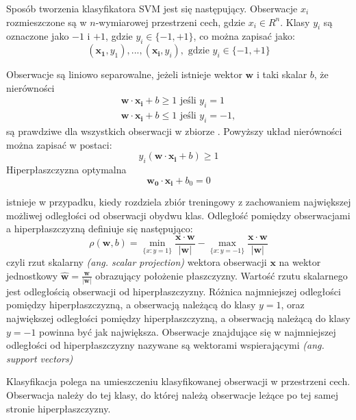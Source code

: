 \documentclass[a4paper,12pt,twoside,openany]{report}
\newcommand{\ang}[1]{\textit{(ang. #1)}}
\begin{document}
Sposób tworzenia klasyfikatora SVM jest się następujący.
Obserwacje $x_i$ rozmieszczone są w $n$-wymiarowej przestrzeni cech, gdzie $x_i \in R^n$.
Klasy $y_i$ są oznaczone jako $-1$ i $+1$, gdzie $y_i \in \{-1, +1\}$, co można zapisać jako:
\begin{equation}
	(\bm{x_1},y_1), ..., (\bm{x_i}, y_i), \textrm{ gdzie } y_i \in \{-1, +1\}
\end{equation}

Obserwacje są liniowo separowalne, jeżeli istnieje wektor $\bm{w}$ i taki skalar $b$, że nierówności
\begin{gather}
	\bm{w} \cdot \bm{x_i} + b \geq 1 \textrm{ jeśli } y_i = 1\\
	\bm{w} \cdot \bm{x_i} + b \leq 1 \textrm{ jeśli } y_i = -1,
\end{gather}
są prawdziwe dla wszystkich obserwacji w zbiorze \cite{Cortes1995}.
Powyższy układ nierówności można zapisać w postaci:
\begin{equation}
	y_i(\bm{w} \cdot \bm{x_i} + b) \geq 1
\end{equation}
Hiperpłaszczyzna optymalna 
\begin{equation}
	\bm{w_0} \cdot \bm{x_i}  + b_0 = 0
\end{equation}

istnieje w przypadku, kiedy rozdziela zbiór treningowy z zachowaniem największej możliwej odległości od obserwacji obydwu klas.
Odległość pomiędzy obserwacjami a hiperpłaszczyzną definiuje się następująco:
\begin{equation}
	\rho(\bm{w}, b) = \min\limits_{\{x:y=1\}} \frac{\bm{x} \cdot \bm{w}} {|\bm{w}|} - \max\limits_{\{x:y=-1\}}  \frac{\bm{x} \cdot \bm{w}} {|\bm{w}|} 
\end{equation}
czyli rzut skalarny \ang{scalar projection} wektora obserwacji $\bm{x}$ na wektor jednostkowy $\hat{\bm{w}} = \frac{\bm{w}}{|\bm{w}|}$
obrazujący położenie płaszczyzny.
Wartość rzutu skalarnego jest odległością obserwacji od hiperpłaszczyzny. 
Różnica najmniejszej odległości pomiędzy hiperpłaszczyzną, a obserwacją należącą do klasy $y=1$,
oraz największej odległości pomiędzy hiperpłaszczyzną, a obserwacją należącą do klasy $y=-1$ 
powinna być jak największa.
Obserwacje znajdujące się w najmniejszej odległości od hiperpłaszczyzny nazywane są wektorami wspierającymi \ang{support vectors}

Klasyfikacja polega na umieszczeniu klasyfikowanej obserwacji w przestrzeni cech.
Obserwacja należy do tej klasy, do której należą obserwacje leżące po tej samej stronie hiperpłaszczyzny.
\end{document}
